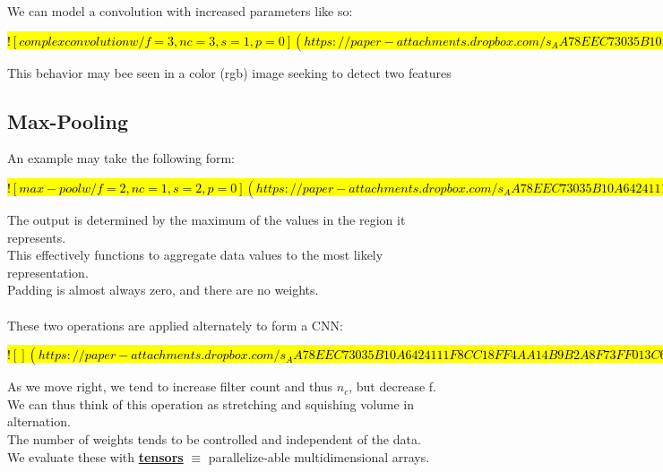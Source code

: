 \documentclass[../../lecture_notes.tex]{subfiles}
\begin{document}
\noindent We can model a convolution with increased parameters like so:

\hl{
$![complex convolution w/ f=3, nc = 3, s = 1, p = 0](https://paper-attachments.dropbox.com/s_AA78EEC73035B10A6424111F8CC18FF4AA14B9B2A8F73FF013C6765837E92F61_1591303830548_Untitled+drawing+2.jpg)$
}

\noindent This behavior may bee seen in a color (rgb) image seeking to detect two features

\subsection*{Max-Pooling}
\noindent An example may take the following form:

\hl{
$![max-pool w/ f = 2, nc = 1, s = 2, p = 0](https://paper-attachments.dropbox.com/s_AA78EEC73035B10A6424111F8CC18FF4AA14B9B2A8F73FF013C6765837E92F61_1591304109912_Untitled+drawing+3.jpg)$
}

\noindent The output is determined by the maximum of the values in the region it represents.\\
This effectively functions to aggregate data values to the most likely representation.\\
Padding is almost always zero, and there are no weights.\\
\\
These two operations are applied alternately to form a CNN:

\hl{
$![](https://paper-attachments.dropbox.com/s_AA78EEC73035B10A6424111F8CC18FF4AA14B9B2A8F73FF013C6765837E92F61_1591304763546_Untitled+drawing+4.jpg)$
}

\noindent As we move right, we tend to increase filter count and thus $n_c$, but decrease f.\\
We can thus think of this operation as stretching and squishing volume in alternation.\\
The number of weights tends to be controlled and independent of the data.\\
We evaluate these with \textbf{\underline{tensors}} $\equiv$ parallelize-able multidimensional arrays.\\
\end{document}
